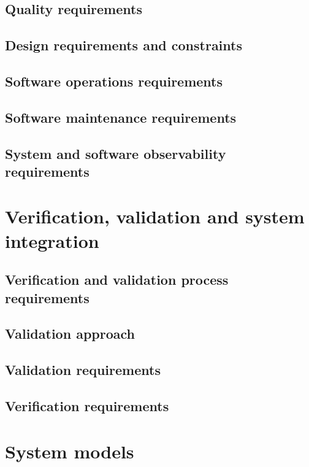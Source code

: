 \subsection{Quality requirements}
\subsection{Design requirements and constraints}
\subsection{Software operations requirements}
\subsection{Software maintenance requirements}
\subsection{System and software observability requirements}
\section{Verification, validation and system integration}
 \subsection{Verification and validation process requirements}
 \subsection{Validation approach}
 \subsection{Validation requirements}
 \subsection{Verification requirements}
 \section{System models}

